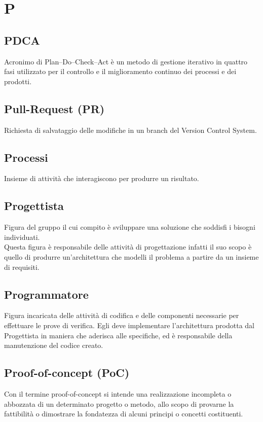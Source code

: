 \section{P}
	\subsection{PDCA} 
		 Acronimo di Plan–Do–Check–Act è un metodo di gestione iterativo in quattro fasi utilizzato per il controllo e il miglioramento continuo dei processi e dei prodotti.
	\subsection{Pull-Request (PR)}  
		Richiesta di salvataggio delle modifiche in un branch del Version Control System.
	\subsection{Processi}  
		Insieme di attività che interagiscono per produrre un risultato.
	\subsection{Progettista} 
		Figura del gruppo il cui compito  è sviluppare una soluzione che soddisfi i bisogni individuati. \\
		Questa figura è responsabile delle attività di progettazione infatti il suo scopo è quello di produrre un’architettura che modelli il problema a partire da un insieme di requisiti.
	\subsection{Programmatore} 
		Figura incaricata delle attività di codifica e delle componenti necessarie per effettuare le prove di verifica. Egli deve implementare l’architettura prodotta dal Progettista in maniera che aderisca alle specifiche, ed è responsabile della manutenzione del codice creato.
	\subsection{Proof-of-concept (PoC) }  
		Con il termine proof-of-concept si intende una realizzazione incompleta o abbozzata di un determinato progetto o metodo, allo scopo di provarne la fattibilità o dimostrare la fondatezza di alcuni principi o concetti costituenti.





\newpage